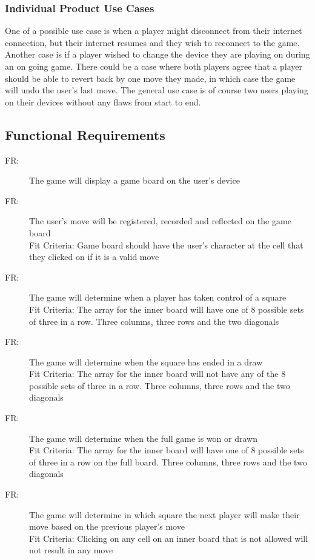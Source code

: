 \documentclass[12pt, titlepage]{article}
\newcounter{funreq}
\newcommand{\frthefunreq}{FR\thefunreq}
\begin{document}
\subsubsection{Individual Product Use Cases}
One of a possible use case is when a player might disconnect from their
internet connection, but their internet resumes and they wish to reconnect to
the game. Another case is if a player wished to change the device they are
playing on during an on going game. There could be a case where both players
agree that a player should be able to revert back by one move they made, in
which case the game will undo the user's last move. The general use case is of
course two users playing on their devices without any flaws from start to end.

\subsection{Functional Requirements}\label{FR}
\begin{description}
\item [ \frthefunreq:] The game will display a game board on the user's device
\item [ \frthefunreq:] The user's move will be registered, recorded and reflected on the game board\\
Fit Criteria: Game board should have the user's character at the cell that they clicked on if it is a valid move
\item [ \frthefunreq:] The game will determine when a player has taken control of a square\\
Fit Criteria: The array for the inner board will have one of 8 possible sets of three in a row. Three columns, three rows 
and the two diagonals
\item [ \frthefunreq:] The game will determine when the square has ended in a draw\\
Fit Criteria: The array for the inner board will not have any of the 8 possible sets of three in a row. Three columns, three rows
 and the two diagonals
\item [ \frthefunreq:] The game will determine when the full game is won or drawn\\
Fit Criteria: The array for the inner board will have one of 8 possible sets of three in a row on the full board. 
Three columns, three rows and the two diagonals
\item [ \frthefunreq:] The game will determine in which square the next player will make their move 
based on the previous player's move\\
Fit Criteria: Clicking on any cell on an inner board that is not allowed will not result in any move
\end{description}
\end{document}

